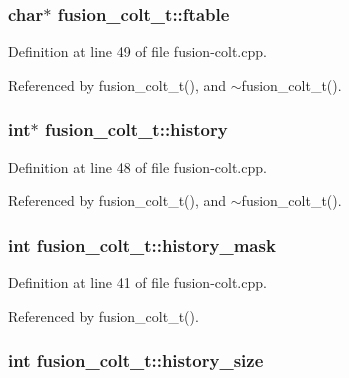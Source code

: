 \subsubsection[{ftable}]{\setlength{\rightskip}{0pt plus 5cm}char$\ast$ {\bf fusion\_\-colt\_\-t::ftable}\hspace{0.3cm}{\tt  [protected]}}\label{classfusion__colt__t_a66a9d755f23805c07015efc8c3a7027}




Definition at line 49 of file fusion-colt.cpp.

Referenced by fusion\_\-colt\_\-t(), and $\sim$fusion\_\-colt\_\-t().
\subsubsection[{history}]{\setlength{\rightskip}{0pt plus 5cm}int$\ast$ {\bf fusion\_\-colt\_\-t::history}\hspace{0.3cm}{\tt  [protected]}}\label{classfusion__colt__t_1d33a087db7fac8860c34d447a74530c}




Definition at line 48 of file fusion-colt.cpp.

Referenced by fusion\_\-colt\_\-t(), and $\sim$fusion\_\-colt\_\-t().
\subsubsection[{history\_\-mask}]{\setlength{\rightskip}{0pt plus 5cm}int {\bf fusion\_\-colt\_\-t::history\_\-mask}\hspace{0.3cm}{\tt  [protected]}}\label{classfusion__colt__t_bcb897f168963a8ba8cde86e2f0b8973}




Definition at line 41 of file fusion-colt.cpp.

Referenced by fusion\_\-colt\_\-t().
\subsubsection[{history\_\-size}]{\setlength{\rightskip}{0pt plus 5cm}int {\bf fusion\_\-colt\_\-t::history\_\-size}\hspace{0.3cm}{\tt  [protected]}}\label{classfusion__colt__t_737fa08ca73f1afa22c28fe6e81e689f}




